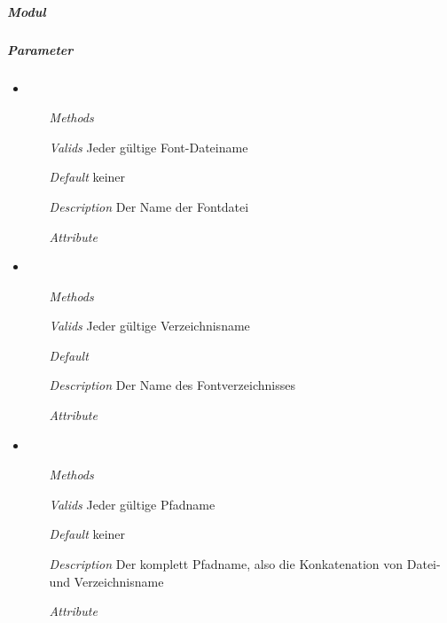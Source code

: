 \newpage

\paragraph{}
\subparagraph{Modul} 


\subparagraph{Parameter}
\begin{itemize}

\item {}
\begin{enumerate}
\item[\textit{Methods}] 
\item[\textit{Valids}] Jeder g\"ultige Font-Dateiname
\item[\textit{Default}] keiner
\item[\textit{Description}] Der Name der Fontdatei
\item[\textit{Attribute}] 
\end{enumerate}

\item {}
\begin{enumerate}
\item[\textit{Methods}] 
\item[\textit{Valids}] Jeder g\"ultige Verzeichnisname
\item[\textit{Default}] 
\item[\textit{Description}] Der Name des Fontverzeichnisses
\item[\textit{Attribute}] 
\end{enumerate}

\item {}
\begin{enumerate}
\item[\textit{Methods}] 
\item[\textit{Valids}] Jeder g\"ultige Pfadname
\item[\textit{Default}] keiner
\item[\textit{Description}] Der komplett Pfadname, also
die Konkatenation von Datei- und Verzeichnisname
\item[\textit{Attribute}] 
\end{enumerate}

\end{itemize}

